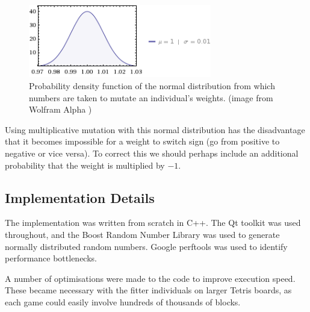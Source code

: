 \documentclass[a4paper,12pt]{article}
\begin{document}
\begin{figure}[htb]
  \centering
  \includegraphics[width=8cm]{normaldist.png}
  \caption{Probability density function of the normal distribution from which
      numbers are taken to mutate an individual's weights. (image from Wolfram
      Alpha \cite{Wolfram})}
  \label{NormalDist}
\end{figure}

Using multiplicative mutation with this normal distribution has the disadvantage
that it becomes impossible for a weight to switch sign (go from positive to
negative or vice versa).
To correct this we should perhaps include an additional probability that the
weight is multiplied by $-1$.

\subsection{Implementation Details}

The implementation was written from scratch in C++.
The Qt toolkit \cite{Qt} was used throughout, and the Boost Random Number
Library \cite{BoostRandom} was used to generate normally distributed random
numbers.
Google perftools \cite{GooglePerftools} was used to identify performance
bottlenecks.

A number of optimisations were made to the code to improve execution speed.
These became necessary with the fitter individuals on larger Tetris boards, as
each game could easily involve hundreds of thousands of blocks.
\end{document}
